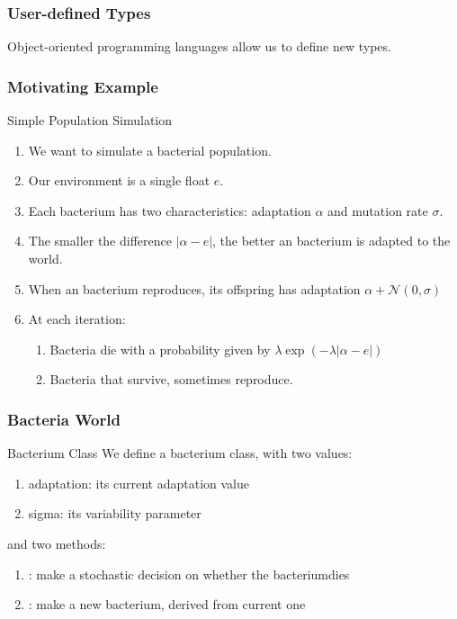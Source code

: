 \begin{frame}[fragile] 
\frametitle{User-defined Types}

Object-oriented programming languages allow us to define new types.

\end{frame}

\begin{frame}[fragile] 
\frametitle{Motivating Example}
\begin{block}{Simple Population Simulation}
\begin{enumerate}
\item We want to simulate a bacterial population.
\item Our environment is a single float $e$.
\item Each bacterium has two characteristics: adaptation $\alpha$ and mutation rate $\sigma$.
\item The smaller the difference $|\alpha-e|$, the better an bacterium is adapted to the world.
\item When an bacterium reproduces, its offspring has adaptation $\alpha + \mathcal{N}(0,\sigma)$
\item At each iteration:
\begin{enumerate}
\item Bacteria die with a probability given by $\lambda\exp(-\lambda|\alpha-e|)$
\item Bacteria that survive, sometimes reproduce.
\end{enumerate}
\end{enumerate}
\end{block}

\end{frame}

\begin{frame}[fragile] 
\frametitle{Bacteria World}
\begin{block}{Bacterium Class}
We define a bacterium class, with two values:
\begin{enumerate}
\item adaptation: its current adaptation value
\item sigma: its variability parameter
\end{enumerate}
and two methods:
\begin{enumerate}
\item {}: make a stochastic decision on whether the bacteriumdies
\item {}: make a new bacterium, derived from current one
\end{enumerate}
\end{block}

\end{frame}

